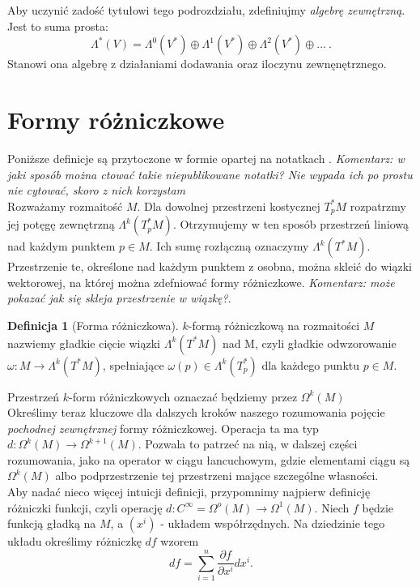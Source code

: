 \documentclass[licencjacka]{pracamgr}
\theoremstyle{definition}
\newtheorem{definition}{Definicja}[section]
\theoremstyle{definition}
\theoremstyle{plain}
\theoremstyle{plain}
\theoremstyle{plain}
\begin{document}
Aby uczynić zadość tytułowi tego podrozdziału, zdefiniujmy
\emph{algebrę zewnętrzną}. Jest to suma prosta:
\[
\Lambda^\ast (V) = 
\Lambda^0(V^\ast) \oplus
\Lambda^1(V^\ast) \oplus
\Lambda^2(V^\ast) \oplus
...~.
\] Stanowi ona algebrę z działaniami dodawania oraz iloczynu zewnęnętrznego. \\

\section{Formy różniczkowe}
Poniższe definicje są przytoczone w formie opartej na notatkach
\cite{duszenko}. 
\emph{Komentarz: w jaki sposób można ctować takie niepublikowane notatki? Nie 
wypada ich po prostu nie cytować, skoro z nich korzystam}
\\

Rozważamy rozmaitość $M$. Dla dowolnej przestrzeni kostycznej 
$T_p^\ast M$ rozpatrzmy jej potęgę zewnętrzną $\Lambda^k(T_p^\ast M)$.
Otrzymujemy w ten sposób przestrzeń liniową nad każdym punktem $p \in M$.
Ich sumę rozłączną oznaczymy $\Lambda^k(T^\ast M)$. Przestrzenie te,
określone nad każdym punktem z osobna, można skleić do wiązki wektorowej, na
której można zdefniować formy różniczkowe.
\emph{Komentarz: może pokazać jak się skleja przestrzenie w wiązkę?}. \\

\begin{definition}[Forma różniczkowa]
  $k$-formą różniczkową na rozmaitości $M$ nazwiemy gładkie cięcie wiązki
  $\Lambda^k(T^\ast M)$ nad M, czyli gładkie odwzorowanie $\omega: M \rightarrow
  \Lambda^k (T^\ast M)$, spełniające $\omega(p) \in \Lambda^k(T_p^\ast)$ dla
  każdego punktu $p \in M$.
\end{definition}

Przestrzeń $k$-form różniczkowych oznaczać będziemy przez $\Omega^k(M)$ \\

Określimy teraz kluczowe dla dalszych kroków naszego rozumowania pojęcie
\emph{pochodnej zewnętrznej} formy różniczkowej. Operacja ta ma typ $d:
\Omega^k(M) \rightarrow \Omega^{k+1} (M)$. Pozwala to patrzeć na nią, w dalszej
części rozumowania, jako na operator w ciągu łancuchowym, gdzie elementami
ciągu są $\Omega^k(M)$ albo podprzestrzenie tej przestrzeni mające szczególne
własności. \\

Aby nadać nieco więcej intuicji definicji, przypomnimy najpierw
definicję różniczki funkcji, czyli operację 
$d: C^\infty = \Omega^o(M) \rightarrow \Omega^1(M)$. Niech $f$ będzie funkcją
gładką na $M$, a $(x^i)$ -  układem współrzędnych. Na dziedzinie tego układu
określimy różniczkę $df$ wzorem
\[
df = \sum_{i=1}^n \frac{\partial f}{\partial x^i} dx^i.
\] \\
\end{document}
